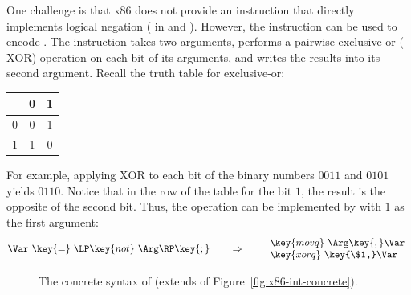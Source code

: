 \documentclass[11pt]{book}
\newcommand{\gray}[1]{{\color{gray} #1}}
\begin{document}
One challenge is that x86 does not provide an instruction that
directly implements logical negation ( in \LangIf{} and
\LangCIf{}).  However, the  instruction can be used to
encode .  The  instruction takes two arguments,
performs a pairwise exclusive-or ($\mathrm{XOR}$) operation on each
bit of its arguments, and writes the results into its second argument.
Recall the truth table for exclusive-or:
\begin{center}
\begin{tabular}{l|cc}
   & 0 & 1 \\ \hline
0  & 0 & 1 \\
1  & 1 & 0
\end{tabular}
\end{center}
For example, applying $\mathrm{XOR}$ to each bit of the binary numbers
$0011$ and $0101$ yields $0110$. Notice that in the row of the table
for the bit $1$, the result is the opposite of the second bit.  Thus,
the  operation can be implemented by  with $1$ as
the first argument:
\[
\Var~ \key{=}~ \LP\key{not}~\Arg\RP\key{;}
\qquad\Rightarrow\qquad
\begin{array}{l}
\key{movq}~ \Arg\key{,} \Var\\
\key{xorq}~ \key{\$1,} \Var
\end{array}
\]


\begin{figure}[tp]
\fbox{
\begin{minipage}{0.96\textwidth}
\[
\begin{array}{lcl}
  \itm{bytereg} &::=& \key{ah} \mid \key{al} \mid \key{bh} \mid \key{bl}
    \mid \key{ch} \mid \key{cl} \mid \key{dh} \mid \key{dl} \\
\Arg &::=& \gray{ \key{\$}\Int \mid \key{\%}\Reg \mid \Int\key{(}\key{\%}\Reg\key{)} } \mid \key{\%}\itm{bytereg}\\
\itm{cc} & ::= & \key{e} \mid \key{l} \mid \key{le} \mid \key{g} \mid \key{ge} \\
\Instr &::=& \gray{ \key{addq} \; \Arg\key{,} \Arg \mid
      \key{subq} \; \Arg\key{,} \Arg \mid
      \key{negq} \; \Arg \mid \key{movq} \; \Arg\key{,} \Arg \mid } \\
  &&  \gray{ \key{callq} \; \itm{label} \mid
      \key{pushq}\;\Arg \mid \key{popq}\;\Arg \mid \key{retq} \mid \key{jmp}\,\itm{label} } \\
  && \gray{ \itm{label}\key{:}\; \Instr }
     \mid \key{xorq}~\Arg\key{,}~\Arg
     \mid \key{cmpq}~\Arg\key{,}~\Arg  \mid \\
  &&  \key{set}cc~\Arg
     \mid \key{movzbq}~\Arg\key{,}~\Arg
     \mid \key{j}cc~\itm{label}
     \\
\LangXIf{} &::= & \gray{ \key{.globl main} }\\
      &    & \gray{ \key{main:} \; \Instr\ldots }
\end{array}
\]
\end{minipage}
}
\caption{The concrete syntax of \LangXIf{}  (extends \LangXInt{} of Figure~\ref{fig:x86-int-concrete}).}
\label{fig:x86-1-concrete}
\end{figure}
\end{document}
